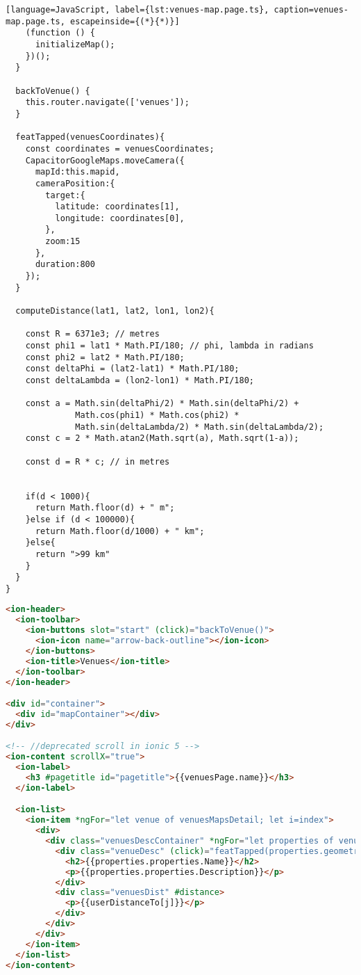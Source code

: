 \begin{lstlisting}[language=JavaScript, label={lst:venues-map.page.ts}, caption=venues-map.page.ts, escapeinside={(*}{*)}]
    (function () {
      initializeMap();
    })();
  }

  backToVenue() {
    this.router.navigate(['venues']);
  }

  featTapped(venuesCoordinates){
    const coordinates = venuesCoordinates;
    CapacitorGoogleMaps.moveCamera({
      mapId:this.mapid,
      cameraPosition:{
        target:{
          latitude: coordinates[1],
          longitude: coordinates[0],
        },
        zoom:15
      },
      duration:800
    });     
  } 

  computeDistance(lat1, lat2, lon1, lon2){
    
    const R = 6371e3; // metres
    const phi1 = lat1 * Math.PI/180; // phi, lambda in radians
    const phi2 = lat2 * Math.PI/180;
    const deltaPhi = (lat2-lat1) * Math.PI/180;
    const deltaLambda = (lon2-lon1) * Math.PI/180;
    
    const a = Math.sin(deltaPhi/2) * Math.sin(deltaPhi/2) +
              Math.cos(phi1) * Math.cos(phi2) *
              Math.sin(deltaLambda/2) * Math.sin(deltaLambda/2);
    const c = 2 * Math.atan2(Math.sqrt(a), Math.sqrt(1-a));
    
    const d = R * c; // in metres

    
    if(d < 1000){
      return Math.floor(d) + " m";
    }else if (d < 100000){
      return Math.floor(d/1000) + " km";
    }else{
      return ">99 km"
    }
  }
}

\end{lstlisting} 

\begin{lstlisting}[language=html, label={lst:venues-map.page.html}, caption=venues-map.page.html]
<ion-header>
  <ion-toolbar>
    <ion-buttons slot="start" (click)="backToVenue()">
      <ion-icon name="arrow-back-outline"></ion-icon>
    </ion-buttons>
    <ion-title>Venues</ion-title>
  </ion-toolbar>
</ion-header>

<div id="container">
  <div id="mapContainer"></div>
</div>

<!-- //deprecated scroll in ionic 5 -->
<ion-content scrollX="true"> 
  <ion-label>
    <h3 #pagetitle id="pagetitle">{{venuesPage.name}}</h3>
  </ion-label>

  <ion-list>
    <ion-item *ngFor="let venue of venuesMapsDetail; let i=index">
      <div>
        <div class="venuesDescContainer" *ngFor="let properties of venue.geojson.features; let j = index">
          <div class="venueDesc" (click)="featTapped(properties.geometry.coordinates)">
            <h2>{{properties.properties.Name}}</h2>
            <p>{{properties.properties.Description}}</p>
          </div>
          <div class="venuesDist" #distance>
            <p>{{userDistanceTo[j]}}</p>
          </div>
        </div>
      </div>
    </ion-item>
  </ion-list>
</ion-content>


\end{lstlisting}